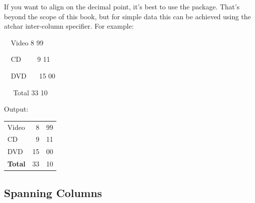 
\label{xmp:decpt}If you want to align on the decimal point, it's best to use the
 package. That's beyond the scope of this
book, but for simple data this can be achieved
using the \gls{atchar} inter-column specifier. For example:
\begin{code}\obeyspaces
{}\newline
\strut~~Video  8  99\newline
\strut~~CD~~~~ 9  11\newline
\strut~~DVD~~~ 15  00\newline
\strut~~ Total  33  10\newline
{}
\end{code}%
Output:\reportpagebreak
\begin{result}
\begin{tabular}{lr@{.}l}
Video & 8 & 99\\
CD & 9 & 11\\
DVD & 15 & 00\\
\bfseries Total & 33 & 10
\end{tabular}
\end{result}%

\subsection{Spanning Columns}
\label{sec:multicolumn}


